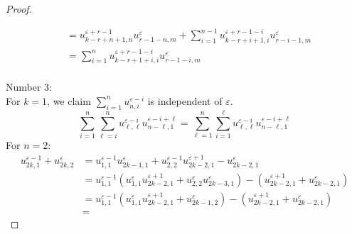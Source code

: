 \documentclass{amsart}
\numberwithin{theorem}{section}
\begin{document}
\begin{proof}
\begin{itemize}
\begin{align*}
          &= u_{k-r+n+1,n}^{\varepsilon+r-1} u_{r-1-n,m}^\varepsilon + \sum\limits_{i=1}^{n-1} u_{k-r+i+1,i}^{\varepsilon+r-1-i} u_{r-i-1,m}^\varepsilon\\
          &= \sum\limits_{i=1}^n u_{k-r+1+i,i}^{\varepsilon+r-1-i} u_{r-1-i,m}^\varepsilon\\
        \end{align*}
    \end{itemize}
    Number 3:\\
    For $k=1$, we claim $\sum\limits_{i=1}^{n} u_{n,i}^{\varepsilon-i}$ is independent of $\varepsilon$.
    \[ \sum\limits_{i=1}^{n} \sum\limits_{\ell=i}^n u_{\ell,\ell}^{\varepsilon-i} u_{n-\ell,1}^{\varepsilon-i+\ell} = \sum\limits_{\ell=1}^n \sum\limits_{i=1}^{\ell} u_{\ell,\ell}^{\varepsilon-i} u_{n-\ell,1}^{\varepsilon-i+\ell}\]
    For $n=2$:\\
    \begin{align*}
      u_{2k,1}^{\varepsilon-1}+u_{2k,2}^{\varepsilon}
      &=
      u_{1,1}^{\varepsilon-1}u_{2k-1,1}^{\varepsilon}+u_{2,2}^{\varepsilon-1}u_{2k-2,1}^{\varepsilon+1}-u_{2k-2,1}^{\varepsilon}\\
      &=
      u_{1,1}^{\varepsilon-1}(u_{1,1}^\varepsilon u_{2k-2,1}^{\varepsilon+1}+u_{2,2}^\varepsilon u_{2k-3,1}^{\varepsilon}) - ( u_{2k-2,1}^{\varepsilon+1} + u_{2k-2,1}^{\varepsilon})\\
      &=
      u_{1,1}^{\varepsilon-1}(u_{1,1}^\varepsilon u_{2k-2,1}^{\varepsilon+1}+u_{2k-1,2}^{\varepsilon}) - ( u_{2k-2,1}^{\varepsilon+1} + u_{2k-2,1}^{\varepsilon})\\
      &=
    \end{align*}
  \end{proof}
\end{document}

